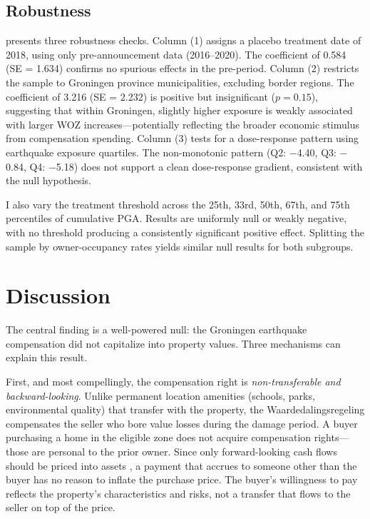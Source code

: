 \documentclass[12pt]{article}
\begin{document}
\subsection{Robustness}



 presents three robustness checks. Column (1) assigns a placebo treatment date of 2018, using only pre-announcement data (2016--2020). The coefficient of 0.584 (SE = 1.634) confirms no spurious effects in the pre-period. Column (2) restricts the sample to Groningen province municipalities, excluding border regions. The coefficient of 3.216 (SE = 2.232) is positive but insignificant ($p = 0.15$), suggesting that within Groningen, slightly higher exposure is weakly associated with larger WOZ increases---potentially reflecting the broader economic stimulus from compensation spending. Column (3) tests for a dose-response pattern using earthquake exposure quartiles. The non-monotonic pattern (Q2: $-$4.40, Q3: $-$0.84, Q4: $-$5.18) does not support a clean dose-response gradient, consistent with the null hypothesis.

I also vary the treatment threshold across the 25th, 33rd, 50th, 67th, and 75th percentiles of cumulative PGA. Results are uniformly null or weakly negative, with no threshold producing a consistently significant positive effect. Splitting the sample by owner-occupancy rates yields similar null results for both subgroups.

\section{Discussion}

The central finding is a well-powered null: the Groningen earthquake compensation did not capitalize into property values. Three mechanisms can explain this result.

First, and most compellingly, the compensation right is \emph{non-transferable and backward-looking}. Unlike permanent location amenities (schools, parks, environmental quality) that transfer with the property, the Waardedalingsregeling compensates the seller who bore value losses during the damage period. A buyer purchasing a home in the eligible zone does not acquire compensation rights---those are personal to the prior owner. Since only forward-looking cash flows should be priced into assets \citep{baldauf2020, bernstein2019}, a payment that accrues to someone other than the buyer has no reason to inflate the purchase price. The buyer's willingness to pay reflects the property's characteristics and risks, not a transfer that flows to the seller on top of the price.
\end{document}
